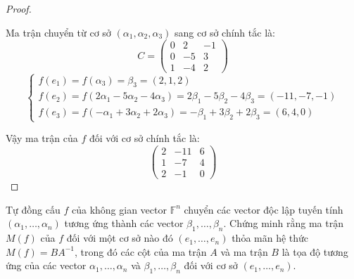\documentclass[class=linearalgebra,crop=false]{standalone}
\begin{document}
\begin{proof}
\[    \]
    \par Ma trận chuyển từ cơ sở $(\alpha_{1}, \alpha_{2}, \alpha_{3})$ sang cơ sở chính tắc là:
    \[
        C =
        \begin{pmatrix}
            0 & 2  & -1 \\
            0 & -5 & 3  \\
            1 & -4 & 2
        \end{pmatrix}
    \]
    \[
        \begin{cases}
            f(e_{1}) = f(\alpha_{3}) = \beta_{3} = (2,1,2)                                                               \\
            f(e_{2}) = f(2\alpha_{1} - 5\alpha_{2} - 4\alpha_{3}) = 2\beta_{1} - 5\beta_{2} - 4\beta_{3} = (-11, -7, -1) \\
            f(e_{3}) = f(-\alpha_{1} + 3\alpha_{2} + 2\alpha_{3}) = -\beta_{1} + 3\beta_{2} + 2\beta_{3} = (6, 4, 0)
        \end{cases}
    \]
    \par Vậy ma trận của $f$ đối với cơ sở chính tắc là:
    \[
        \begin{pmatrix}
            2 & -11 & 6 \\
            1 & -7  & 4 \\
            2 & -1  & 0
        \end{pmatrix}
    \]
\end{proof}

\begin{exercise}
    Tự đồng cấu $f$ của không gian vector $\mathbb{F}^{n}$ chuyển các vector độc lập tuyến tính $(\alpha_{1}, \ldots, \alpha_{n})$ tương ứng thành các vector $\beta_{1}, \ldots, \beta_{n}$. Chứng minh rằng ma trận $M(f)$ của $f$ đối với một cơ sở nào đó $(e_{1},\ldots, e_{n})$ thỏa mãn hệ thức $M(f) = BA^{-1}$, trong đó các cột của ma trận $A$ và ma trận $B$ là tọa độ tương ứng của các vector $\alpha_{1}, \ldots, \alpha_{n}$ và $\beta_{1}, \ldots, \beta_{n}$ đối với cơ sở $(e_{1}, \ldots, e_{n})$.
\end{exercise}
\end{document}
